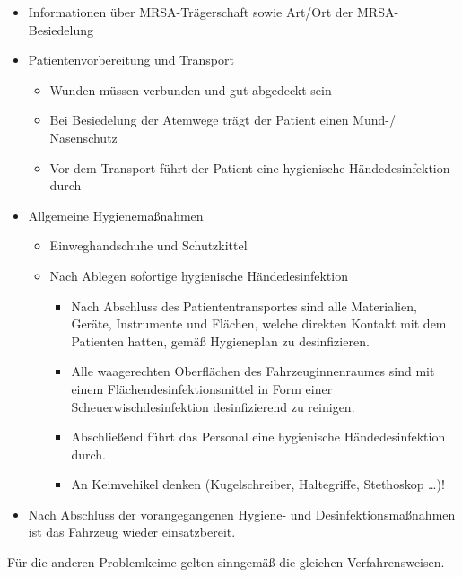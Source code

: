 %
\label{m:mrsa-transport}%
\begin{itemize}
  \item Informationen über MRSA-Trägerschaft sowie Art/Ort der MRSA-Besiedelung
  \item Patientenvorbereitung und Transport
  \begin{itemize}
    \item Wunden müssen verbunden und gut abgedeckt sein
    \item Bei Besiedelung der Atemwege trägt der Patient einen Mund-/ Nasenschutz
    \item Vor dem Transport führt der Patient eine hygienische
    Händedesinfektion durch
  \end{itemize}
  \item Allgemeine Hygienemaßnahmen
  \begin{itemize}
    \item Einweghandschuhe und Schutzkittel
    \item Nach Ablegen sofortige hygienische Händedesinfektion
    \begin{itemize}
      \item Nach Abschluss des Patiententransportes sind alle Materialien,
      Geräte, Instrumente und Flächen, welche direkten Kontakt mit dem
      Patienten hatten, gemäß Hygieneplan zu
      desinfizieren.
      \item Alle waagerechten Oberflächen des Fahrzeuginnenraumes sind mit
      einem Flächendesinfektionsmittel in Form einer
      Scheuerwischdesinfektion desinfizierend zu reinigen.
      \item Abschließend führt das Personal eine hygienische
      Händedesinfektion durch.
      \item An Keimvehikel denken (Kugelschreiber, Haltegriffe, Stethoskop \ldots )!
    \end{itemize}
  \end{itemize}
  \item Nach Abschluss der vorangegangenen Hygiene- und
  Desinfektionsmaßnahmen ist das Fahrzeug wieder einsatzbereit.
\end{itemize}

Für die anderen Problemkeime  gelten sinngemäß die gleichen
Verfahrensweisen.
